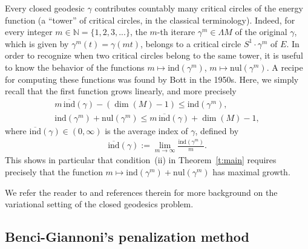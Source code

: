 \documentclass[reqno]{amsart}
\numberwithin{equation}{section}
\theoremstyle{personal}%
\theoremstyle{definition}
\newcommand{\N}{\mathds{N}}
\newcommand{\avind}{\overline{\ind}}
\newcommand{\ind}{\mathrm{ind}}
\newcommand{\nul}{\mathrm{nul}}
\begin{document}
Every closed geodesic $\gamma$ contributes countably many critical circles of the energy function (a ``tower'' of critical circles, in the classical terminology). Indeed, for every integer $m\in\N=\{1,2,3,...\}$, the $m$-th iterare $\gamma^m\in\Lambda M$ of the original $\gamma$, which is given by $\gamma^m(t)=\gamma(mt)$, belongs to a critical circle $S^1\cdot\gamma^m$ of $E$. In order to recognize when two critical circles belong to the same tower, it is useful to know the behavior of the functions $m\mapsto\ind(\gamma^m)$, $m\mapsto\nul(\gamma^m)$. A recipe for computing these functions was found by Bott \cite{Bott:1956sp} in the 1950s. Here, we simply recall that the first function grows linearly, and more precisely
\begin{gather}
\label{e:iteration_inequality_1}
m\,\avind(\gamma)-(\dim(M)-1)
\leq
\ind(\gamma^m),\\
\label{e:iteration_inequality_2}
\ind(\gamma^m)+\nul(\gamma^m)
\leq 
m\,\avind(\gamma)+\dim(M)-1,
\end{gather}
where $\avind(\gamma)\in(0,\infty)$ is the average index of $\gamma$, defined by
\begin{align*}
\avind(\gamma):=\lim_{m\to\infty} \frac{\ind(\gamma^m)}{m}.
\end{align*}
This shows in particular that condition~(ii) in Theorem~\ref{t:main} requires precisely that the function $m\mapsto\ind(\gamma^m)+\nul(\gamma^m)$ has maximal growth.

We refer the reader to \cite{Klingenberg:1978so, Klingenberg:1995fv, Long:2002ed} and references therein for more background on the variational setting of the closed geodesics problem.


\subsection{Benci-Giannoni's penalization method}
\label{s:Benci_Giannoni}
\end{document}
